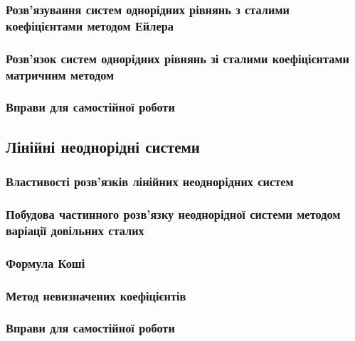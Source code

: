 		\subsubsection{Розв'язування систем однорідних рівнянь з сталими коефіцієнтами методом Ейлера \todo}
		

		\subsubsection{Розв'язок систем однорідних рівнянь зі сталими коефіцієнтами матричним методом \todo}
		

		\subsubsection{Вправи для самостійної роботи \todo}
		

	\subsection{Лінійні неоднорідні системи \todo}
	

		\subsubsection{Властивості розв'язків лінійних неоднорідних систем \todo}
		

		\subsubsection{Побудова частинного розв'язку неоднорідної системи методом варіації довільних сталих \todo}
		

		\subsubsection{Формула Коші \todo}
		

		\subsubsection{Метод невизначених коефіцієнтів \todo}
		

		\subsubsection{Вправи для самостійної роботи \todo}
		

\newpage

\nocite{*}





